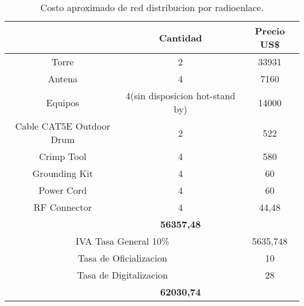 \begin{table}[htbp]
  \centering
    \begin{tabular}{|cc|c}
    \hline
    \rowcolor[rgb]{ .773,  .851,  .945} \multicolumn{1}{|c|}{\textbf{Articulo}} & \textbf{Cantidad} & \multicolumn{1}{c|}{\textbf{Precio US\$}} \bigstrut\\
    \hline
    \multicolumn{1}{|p{13.22em}|}{Torre} & 2     & \multicolumn{1}{c|}{33931} \bigstrut\\
    \hline
    \multicolumn{1}{|p{13.22em}|}{Antena} & 4     & \multicolumn{1}{c|}{7160} \bigstrut\\
    \hline
    \multicolumn{1}{|p{13.22em}|}{Equipos} & \multicolumn{1}{p{10.555em}|}{4(sin disposicion hot-stand by)} & \multicolumn{1}{c|}{14000} \bigstrut\\
    \hline
    \multicolumn{1}{|p{13.22em}|}{Cable CAT5E Outdoor Drum} & 2     & \multicolumn{1}{c|}{522} \bigstrut\\
    \hline
    \multicolumn{1}{|p{13.22em}|}{Crimp Tool} & 4     & \multicolumn{1}{c|}{580} \bigstrut\\
    \hline
    \multicolumn{1}{|p{13.22em}|}{Grounding Kit} & 4     & \multicolumn{1}{c|}{60} \bigstrut\\
    \hline
    \multicolumn{1}{|p{13.22em}|}{Power Cord} & 4     & \multicolumn{1}{c|}{60} \bigstrut\\
    \hline
    \multicolumn{1}{|p{13.22em}|}{RF Connector} & 4     & \multicolumn{1}{c|}{44,48} \bigstrut\\
    \hline
    \rowcolor[rgb]{ .773,  .851,  .945} \multicolumn{2}{|c|}{\textbf{Costo}} & \multicolumn{1}{c|}{\textbf{56357,48}} \bigstrut\\
    \hline
    \multicolumn{2}{|p{23.775em}|}{IVA Tasa General 10\%} & \multicolumn{1}{c|}{5635,748} \bigstrut\\
    \hline
    \multicolumn{2}{|p{23.775em}|}{Tasa de Oficializacion} & \multicolumn{1}{c|}{10} \bigstrut\\
    \hline
    \multicolumn{2}{|p{23.775em}|}{Tasa de Digitalizacion} & \multicolumn{1}{c|}{28} \bigstrut\\
    \hline
    \rowcolor[rgb]{ .773,  .851,  .945} \multicolumn{2}{|c|}{\textbf{Total}} & \textbf{62030,74} \bigstrut\\
    \hline
    \end{tabular}%
	\caption{Costo aproximado de red distribucion por radioenlace.}
  \label{tab:costo-aproximado-RE}%
\end{table}%


